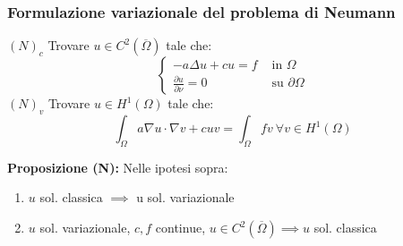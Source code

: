 \documentclass[a4paper]{article}
\begin{document}
\subsubsection{Formulazione variazionale del problema di Neumann}
$(N)_c$ Trovare $u\in C^2(\overline\Omega)$ tale che:
\[\begin{cases}
	-a\Delta u+cu=f&\text{ in }\Omega
	\\\frac{\partial u}{\partial \nu} =0&\text{ su }\partial \Omega
\end{cases}\]
$(N)_v$ Trovare $u\in H^1(\Omega)$ tale che:
\[\int_{\Omega}^{} a\nabla u\cdot \nabla v+cuv=\int_{\Omega}^{} fv\ \forall v\in H^1(\Omega)\]
\begin{tcolorbox}
	\textbf{Proposizione (N):} Nelle ipotesi sopra:
	\begin{enumerate}
		\item $u$ sol. classica $\implies $ u sol. variazionale
		\item $u$ sol. variazionale, $c,f$ continue, $u\in C^2(\overline\Omega)\implies u$ sol. classica
	\end{enumerate}
\end{tcolorbox}
\end{document}
